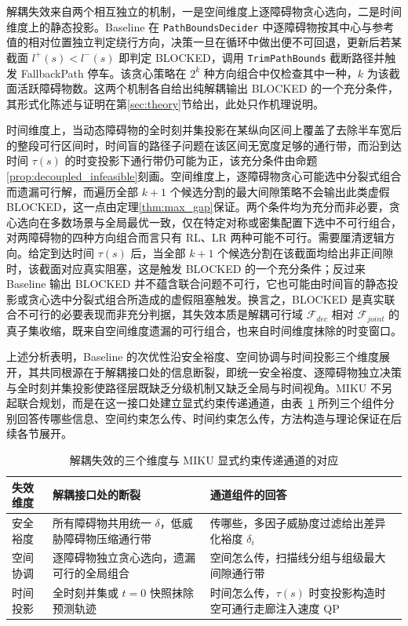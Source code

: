 \documentclass[a4paper,11pt]{ctexart}
\theoremstyle{definition}
\begin{document}
解耦失效来自两个相互独立的机制，一是空间维度上逐障碍物贪心选向，二是时间维度上的静态投影。Baseline 在 \texttt{PathBoundsDecider} 中逐障碍物按其中心与参考值的相对位置独立判定绕行方向，决策一旦在循环中做出便不可回退，更新后若某截面 $l^{+}(s) < l^{-}(s)$ 即判定 BLOCKED，调用 \texttt{TrimPathBounds} 截断路径并触发 FallbackPath 停车。该贪心策略在 $2^k$ 种方向组合中仅检查其中一种，$k$ 为该截面活跃障碍物数。这两个机制各自给出纯解耦输出 BLOCKED 的一个充分条件，其形式化陈述与证明在第\ref{sec:theory}节给出，此处只作机理说明。

时间维度上，当动态障碍物的全时刻并集投影在某纵向区间上覆盖了去除半车宽后的整段可行区间时，时间盲的路径子问题在该区间无宽度足够的通行带，而沿到达时间 $\tau(s)$ 的时变投影下通行带仍可能为正，该充分条件由命题\ref{prop:decoupled_infeasible}刻画。空间维度上，逐障碍物贪心可能选中分裂式组合而遗漏可行解，而遍历全部 $k+1$ 个候选分割的最大间隙策略不会输出此类虚假 BLOCKED，这一点由定理\ref{thm:max_gap}保证。两个条件均为充分而非必要，贪心选向在多数场景与全局最优一致，仅在特定对称或密集配置下选中不可行组合，对两障碍物的四种方向组合而言只有 RL、LR 两种可能不可行。需要厘清逻辑方向。给定到达时间 $\tau(s)$ 后，当全部 $k+1$ 个候选分割在该截面均给出非正间隙时，该截面对应真实阻塞，这是触发 BLOCKED 的一个充分条件；反过来 Baseline 输出 BLOCKED 并不蕴含联合问题不可行，它也可能由时间盲的静态投影或贪心选中分裂式组合所造成的虚假阻塞触发。换言之，BLOCKED 是真实联合不可行的必要表现而非充分判据，其失效本质是解耦可行域 $\mathcal{F}_{dec}$ 相对 $\mathcal{F}_{joint}$ 的真子集收缩，既来自空间维度遗漏的可行组合，也来自时间维度抹除的时变窗口。

上述分析表明，Baseline 的次优性沿安全裕度、空间协调与时间投影三个维度展开，其共同根源在于解耦接口处的信息断裂，即统一安全裕度、逐障碍物独立决策与全时刻并集投影使路径层既缺乏分级机制又缺乏全局与时间视角。MIKU 不另起联合规划，而是在这一接口处建立显式约束传递通道，由表~\ref{tab:prob_channel} 所列三个组件分别回答传哪些信息、空间约束怎么传、时间约束怎么传，方法构造与理论保证在后续各节展开。

\begin{table}[htbp]
\centering
\caption{解耦失效的三个维度与 MIKU 显式约束传递通道的对应}
\label{tab:prob_channel}
\begin{tabular}{p{2.4cm} p{4.6cm} p{4.6cm}}
\hline
失效维度 & 解耦接口处的断裂 & 通道组件的回答 \\
\hline
安全裕度 & 所有障碍物共用统一 $\delta$，低威胁障碍物压缩通行带 & 传哪些，多因子威胁度过滤给出差异化裕度 $\delta_i$ \\
空间协调 & 逐障碍物独立贪心选向，遗漏可行的全局组合 & 空间怎么传，扫描线分组与组级最大间隙通行带 \\
时间投影 & 全时刻并集或 $t{=}0$ 快照抹除预测轨迹 & 时间怎么传，$\tau(s)$ 时变投影构造时空可通行走廊注入速度 QP \\
\hline
\end{tabular}
\end{table}
\end{document}
